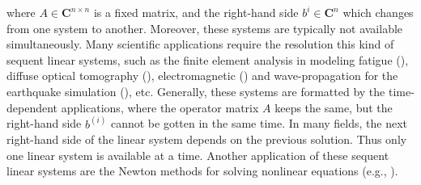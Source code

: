 where $A \in \mathbf{C}^{n\times n}$ is a fixed matrix, and the right-hand side $b^{i} \in \mathbf{C}^n$ which changes from one system to another. Moreover, these systems are typically not available simultaneously. Many scientific applications require the resolution this kind of sequent linear systems, such as the finite element analysis in modeling fatigue (\cite{newman1976finite, gullerud2001mpi,sukumar2003extended}), diffuse optical tomography (\cite{kilmer2006recycling,arridge1993finite,schweiger1995finite}), electromagnetic (\cite{bastos2003electromagnetic,pridmore1981investigation, ye2008generalized}) and wave-propagation for the earthquake simulation (\cite{Fujita:2018:WPS:3149457.3149474,moczo2007finite,chen2015transient}), etc. Generally, these systems are formatted by the time-dependent applications, where the operator matrix $A$ keeps the same, but the right-hand side $b^{(i)}$ cannot be gotten in the same time. In many fields, the next right-hand side of the linear system depends on the previous solution. Thus only one linear system is available at a time. Another application of these sequent linear systems are the Newton methods for solving nonlinear equations (e.g., \cite{brown1990hybrid,knoll2004jacobian,bellavia2001globally,flueck1998solving,an2007globally}). 

